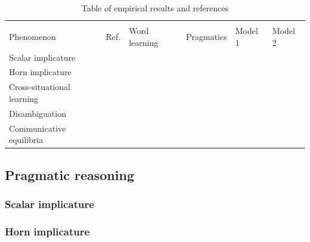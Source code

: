 \documentclass{article} %
\begin{document}
\begin{table}[t]
\caption{Table of empirical results and references}
\label{tab:results}
\begin{center}
\begin{tabular}{llllll}
\hline \\
Phenomenon & Ref. & Word learning \cite{frank2009} & Pragmatics \cite{frank2012,bergen2012}  & Model 1 & Model 2 \\
\hline
Scalar implicature & \cite{stiller2011} & & & & \\
Horn implicature & & & & & \\
Cross-situational learning & \cite{yu2007} & & & & \\
Disambiguation & \cite{markman1988} & & & & \\
Communicative equilibria & \cite{galantucci2007} & & & & \\
\end{tabular}
\end{center}
\end{table}

\subsection{Pragmatic reasoning}

\subsubsection{Scalar implicature}

%
%

\subsubsection{Horn implicature}

%
%
\end{document}
